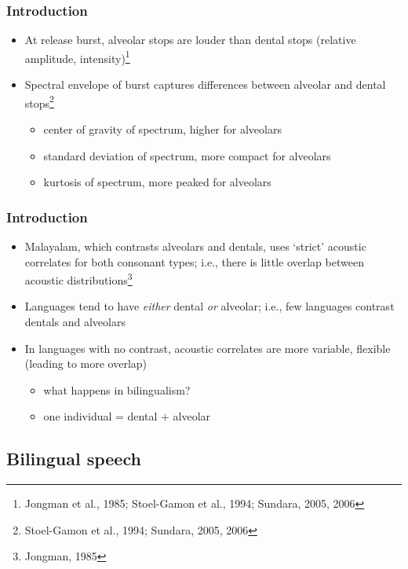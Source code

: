 \documentclass{beamer}
\begin{document}
\begin{frame}
\frametitle{Introduction}
\begin{itemize}
	\item At release burst, alveolar stops are louder than dental stops (relative amplitude, intensity)\footnote{Jongman et al., 1985; Stoel-Gamon et al., 1994; Sundara, 2005, 2006}
	\item Spectral envelope of burst captures differences between alveolar and dental stops\footnote{Stoel-Gamon et al., 1994; Sundara, 2005, 2006}
	\begin{itemize}
		\item center of gravity of spectrum, higher for alveolars
		\item standard deviation of spectrum, more compact for alveolars
		\item kurtosis of spectrum, more peaked for alveolars
	\end{itemize}
\end{itemize}
\end{frame}

\begin{frame}
\frametitle{Introduction}
\begin{itemize}
	\item Malayalam, which contrasts alveolars and dentals, uses `strict' acoustic correlates for both consonant types; i.e., there is little overlap between acoustic distributions\footnote{Jongman, 1985}
	\item Languages tend to have \emph{either} dental \emph{or} alveolar; i.e., few languages contrast dentals and alveolars
	\item In languages with no contrast, acoustic correlates are more variable, flexible (leading to more overlap)
	\begin{itemize}
		\item \alert{what happens in bilingualism?}
		\item \alert{one individual = dental $+$ alveolar}
	\end{itemize}
\end{itemize}
\end{frame}

\subsection{Bilingual speech}
\end{document}
